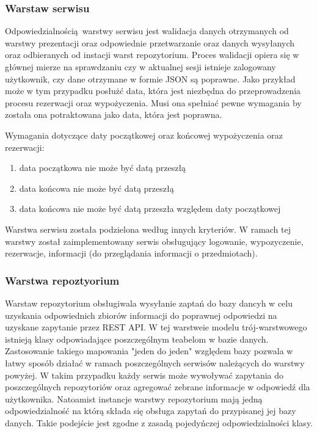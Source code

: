 \documentclass{article}
\begin{document}
\subsubsection{Warstaw serwisu}

Odpowiedzialnością warstwy serwisu jest walidacja danych otrzymanych od warstwy prezentacji oraz odpowiednie przetwarzanie oraz danych wysyłanych oraz odbieranych
od instacji warst repozytorium. Proces walidacji opiera się w głównej mierze na sprawdzaniu czy w aktualnej sesji istnieje zalogowany użytkownik, czy dane 
otrzymane w formie JSON są poprawne. Jako przykład może w tym przypadku posłużć data, która jest niezbędna do przeprowadzenia procesu rezerwacji oraz wypożyczenia.
Musi ona spełniać pewne wymagania by została ona potraktowana jako data, która jest poprawna.

Wymagania dotyczące daty początkowej oraz końcowej wypożyczenia oraz rezerwacji:
\begin{center}
    \begin{enumerate}
        \item data początkowa nie może być datą przeszłą 
        \item data końcowa nie może być datą przeszłą
        \item data końcowa nie może być datą przeszła względem daty początkowej
    \end{enumerate}
\end{center}

Warstwa serwisu została podzielona według innych kryteriów. W ramach tej warstwy został zaimplementowany serwis obsługujący logowanie, wypozyczenie, rezerwacje, 
informacji (do przeglądania informacji  o przedmiotach).

\subsubsection{Warstwa repoztyorium}

Warstaw repozytorium obsługiwala wysyłanie zaptań do bazy dancyh w celu uzyskania odpowiednich zbiorów informacji do poprawnej odpowiedzi na uzyskane zapytanie przez REST API.
W tej warstweie modelu trój-warstwowego istnieją klasy odpowiadające poszczególnym teabelom w bazie danych. Zastosowanie takiego mapowania "jeden do jeden"
względem bazy pozwala w łatwy sposób działać w ramach poszczególnych serwisów należących do warstwy powyżej. W takim przypadku każdy serwis może wywoływać zapytania do poszczególnych 
repozytoriów oraz agregować zebrane informacje w odpowiedź dla użytkownika. Natoamist instancje warstwy repozytorium mają jedną odpowiedzialność na którą składa się obsługa zapytań do
przypisanej jej bazy danych. Takie podejście jest zgodne z zasadą pojedyńczej odpowiedzialności klasy. \\
\end{document}
